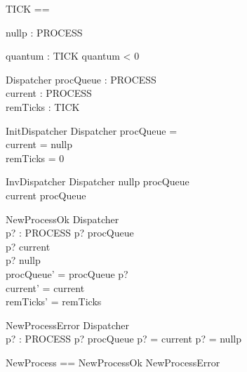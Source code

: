 \begin{zed}
    [PROCESS]
\also
    TICK == \nat
\end{zed}

\begin{axdef}
    nullp : PROCESS
\end{axdef}

\begin{axdef}
    quantum : TICK
\where
    quantum < 0
\end{axdef}

\begin{schema}{Dispatcher}
    procQueue : \seq PROCESS \\
    current : PROCESS \\
    remTicks : TICK
\end{schema}

\begin{schema}{InitDispatcher}
    Dispatcher
\where
    procQueue = \langle \rangle \\
    current = nullp \\
    remTicks = 0
\end{schema}

\begin{schema}{InvDispatcher}
    Dispatcher
\where
    nullp \notin \ran procQueue \\
    current \notin \ran procQueue
\end{schema}

\begin{schema}{NewProcessOk}
    \Delta Dispatcher \\
    p? : PROCESS
\where
    p? \notin \ran procQueue \\
    p? \neq current \\
    p? \neq nullp \\
    procQueue' = procQueue \cat \langle p? \rangle \\
    current' = current \\
    remTicks' = remTicks
\end{schema}

\begin{schema}{NewProcessError}
    \Xi Dispatcher \\
    p? : PROCESS
\where
    p? \in \ran procQueue \lor p? = current \lor p? = nullp
\end{schema}

\begin{zed}
    NewProcess == NewProcessOk \lor NewProcessError
\end{zed}


